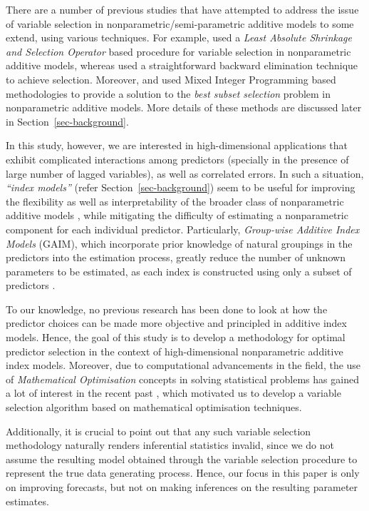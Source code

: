 \documentclass[11pt,a4paper,]{article}
\begin{document}
There are a number of previous studies that have attempted to address
the issue of variable selection in nonparametric/semi-parametric
additive models to some extend, using various techniques. For example,
\textcite{Huang2010} used a \emph{Least Absolute Shrinkage and Selection
Operator} \autocite[LASSO,][]{Tibshirani1996} based procedure for
variable selection in nonparametric additive models, whereas
\textcite{FH2012} used a straightforward backward elimination technique
to achieve selection. Moreover, \textcite{Ibrahim2021} and
\textcite{Hazimeh2023} used Mixed Integer Programming based
methodologies to provide a solution to the \emph{best subset selection}
problem in nonparametric additive models. More details of these methods
are discussed later in Section~\ref{sec-background}.

In this study, however, we are interested in high-dimensional
applications that exhibit complicated interactions among predictors
(specially in the presence of large number of lagged variables), as well
as correlated errors. In such a situation, \emph{``index models''}
(refer Section~\ref{sec-background}) seem to be useful for improving the
flexibility as well as interpretability of the broader class of
nonparametric additive models \autocite{Radchenko2015}, while mitigating
the difficulty of estimating a nonparametric component for each
individual predictor. Particularly, \emph{Group-wise Additive Index
Models} (GAIM), which incorporate prior knowledge of natural groupings
in the predictors into the estimation process, greatly reduce the number
of unknown parameters to be estimated, as each index is constructed
using only a subset of predictors \autocite{Wang2015-mp,Masselot2022}.

To our knowledge, no previous research has been done to look at how the
predictor choices can be made more objective and principled in additive
index models. Hence, the goal of this study is to develop a methodology
for optimal predictor selection in the context of high-dimensional
nonparametric additive index models. Moreover, due to computational
advancements in the field, the use of \emph{Mathematical Optimisation}
concepts in solving statistical problems has gained a lot of interest in
the recent past \autocite{Theusl2020}, which motivated us to develop a
variable selection algorithm based on mathematical optimisation
techniques.

Additionally, it is crucial to point out that any such variable
selection methodology naturally renders inferential statistics invalid,
since we do not assume the resulting model obtained through the variable
selection procedure to represent the true data generating process.
Hence, our focus in this paper is only on improving forecasts, but not
on making inferences on the resulting parameter estimates.
\end{document}
